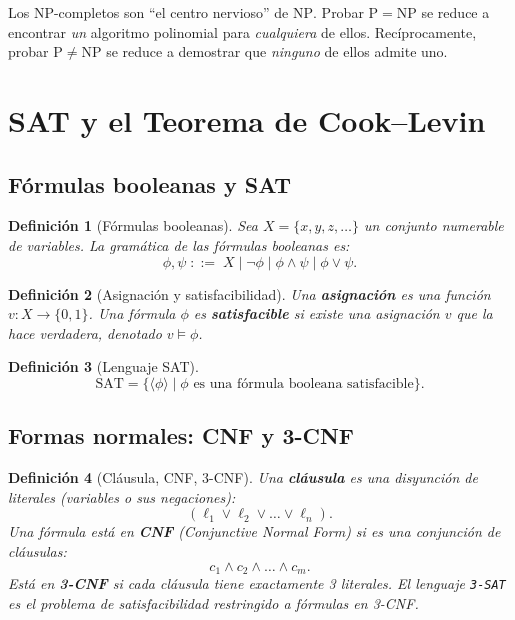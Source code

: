 \documentclass[11pt,a4paper]{article}
\theoremstyle{definicion}
\newtheorem{definicion}{Definición}[section]
\newcommand{\enc}[1]{\langle #1 \rangle}
\newcommand{\NP}{\mathrm{NP}}
\newcommand{\Pclass}{\mathrm{P}}
\begin{document}
\begin{idea}
Los NP-completos son ``el centro nervioso'' de $\NP$. Probar $\Pclass = \NP$ se reduce a encontrar \emph{un} algoritmo polinomial para \emph{cualquiera} de ellos. Recíprocamente, probar $\Pclass \neq \NP$ se reduce a demostrar que \emph{ninguno} de ellos admite uno.
\end{idea}

\section{SAT y el Teorema de Cook--Levin}

\subsection{Fórmulas booleanas y SAT}

\begin{definicion}[Fórmulas booleanas]
Sea $X = \{x, y, z, \dots\}$ un conjunto numerable de variables. La gramática de las fórmulas booleanas es:
\[
\phi, \psi \;::=\; X \mid \neg\phi \mid \phi \land \psi \mid \phi \lor \psi.
\]
\end{definicion}

\begin{definicion}[Asignación y satisfacibilidad]
Una \textbf{asignación} es una función $v : X \to \{0, 1\}$. Una fórmula $\phi$ es \textbf{satisfacible} si existe una asignación $v$ que la hace verdadera, denotado $v \models \phi$.
\end{definicion}

\begin{definicion}[Lenguaje SAT]
\[
\mathrm{SAT} = \{ \enc{\phi} \mid \phi \text{ es una fórmula booleana satisfacible}\}.
\]
\end{definicion}

\subsection{Formas normales: CNF y 3-CNF}

\begin{definicion}[Cláusula, CNF, 3-CNF]
Una \textbf{cláusula} es una disyunción de literales (variables o sus negaciones):
\[
(\ell_1 \lor \ell_2 \lor \dots \lor \ell_n).
\]
Una fórmula está en \textbf{CNF} (Conjunctive Normal Form) si es una conjunción de cláusulas:
\[
c_1 \land c_2 \land \dots \land c_m.
\]
Está en \textbf{3-CNF} si cada cláusula tiene exactamente 3 literales. El lenguaje \texttt{3-SAT} es el problema de satisfacibilidad restringido a fórmulas en 3-CNF.
\end{definicion}
\end{document}
